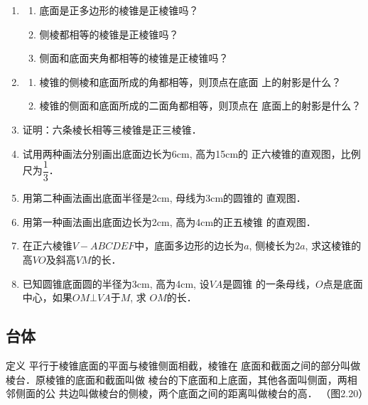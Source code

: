 \begin{ex}
\begin{enumerate}
    \item \begin{enumerate}
        \item 底面是正多边形的棱锥是正棱锥吗？
    \item 侧棱都相等的棱锥是正棱锥吗？
    \item 侧面和底面夹角都相等的棱锥是正棱锥吗？
    \end{enumerate}
  
    \item 
    \begin{enumerate}
      \item 棱锥的侧棱和底面所成的角都相等，则顶点在底面
    上的射影是什么？
    \item 棱锥的侧面和底面所成的二面角都相等，则顶点在
    底面上的射影是什么？  
    \end{enumerate}
    
    \item 证明：六条棱长相等三棱锥是正三棱锥．
    \item 试用两种画法分别画出底面边长为6cm, 高为15cm的
    正六棱锥的直观图，比例尺为$\dfrac{1}{3}$．
    \item 用第二种画法画出底面半径是2cm, 母线为3cm的圆锥的
    直观图．
    \item 用第一种画法画出底面边长为2cm, 高为4cm的正五棱锥
    的直观图．
    \item 在正六棱锥$V-ABCDEF$中，底面多边形的边长为$a$,
    侧棱长为$2a$, 求这棱锥的高$VO$及斜高$VM$的长．
    \item 已知圆锥底面圆的半径为3cm, 高为4cm, 设$VA$是圆锥
    的一条母线，$O$点是底面中心，如果$OM\bot VA$于$M$, 求
    $OM$的长．
\end{enumerate}
\end{ex}

\subsection{台体}
\begin{blk}{定义}
    平行于棱锥底面的平面与棱锥侧面相截，棱锥在
底面和截面之间的部分叫做棱台．原棱锥的底面和截面叫做
棱台的下底面和上底面，其他各面叫侧面，两相邻侧面的公
共边叫做棱台的侧棱，两个底面之间的距离叫做棱台的高．
（图2.20）
\end{blk}

